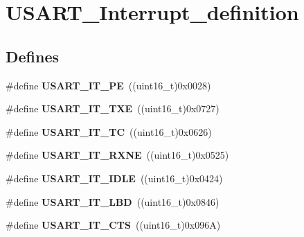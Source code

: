\hypertarget{group__USART__Interrupt__definition}{
\section{USART\_\-Interrupt\_\-definition}
\label{group__USART__Interrupt__definition}
}
\subsection*{Defines}
\begin{DoxyCompactItemize}
\item 
\hypertarget{group__USART__Interrupt__definition_gae607c28a462c224c575b7541dc4f7067}{
\#define {\bfseries USART\_\-IT\_\-PE}~((uint16\_\-t)0x0028)}
\label{group__USART__Interrupt__definition_gae607c28a462c224c575b7541dc4f7067}

\item 
\hypertarget{group__USART__Interrupt__definition_gab18d0fe889204a4c34f6d5817fb5147d}{
\#define {\bfseries USART\_\-IT\_\-TXE}~((uint16\_\-t)0x0727)}
\label{group__USART__Interrupt__definition_gab18d0fe889204a4c34f6d5817fb5147d}

\item 
\hypertarget{group__USART__Interrupt__definition_ga748e86162cc110513330079982821c39}{
\#define {\bfseries USART\_\-IT\_\-TC}~((uint16\_\-t)0x0626)}
\label{group__USART__Interrupt__definition_ga748e86162cc110513330079982821c39}

\item 
\hypertarget{group__USART__Interrupt__definition_gacdd49b93072655a21a63a35e6431f8ae}{
\#define {\bfseries USART\_\-IT\_\-RXNE}~((uint16\_\-t)0x0525)}
\label{group__USART__Interrupt__definition_gacdd49b93072655a21a63a35e6431f8ae}

\item 
\hypertarget{group__USART__Interrupt__definition_ga5d85aab24b7b2dfddb61ba2a49fa6185}{
\#define {\bfseries USART\_\-IT\_\-IDLE}~((uint16\_\-t)0x0424)}
\label{group__USART__Interrupt__definition_ga5d85aab24b7b2dfddb61ba2a49fa6185}

\item 
\hypertarget{group__USART__Interrupt__definition_ga063628e16cdda199b07d380421afc4a5}{
\#define {\bfseries USART\_\-IT\_\-LBD}~((uint16\_\-t)0x0846)}
\label{group__USART__Interrupt__definition_ga063628e16cdda199b07d380421afc4a5}

\item 
\hypertarget{group__USART__Interrupt__definition_gab49efbefaca2921e8cbe8f5146e99dbd}{
\#define {\bfseries USART\_\-IT\_\-CTS}~((uint16\_\-t)0x096A)}
\label{group__USART__Interrupt__definition_gab49efbefaca2921e8cbe8f5146e99dbd}


\end{DoxyCompactItemize}

